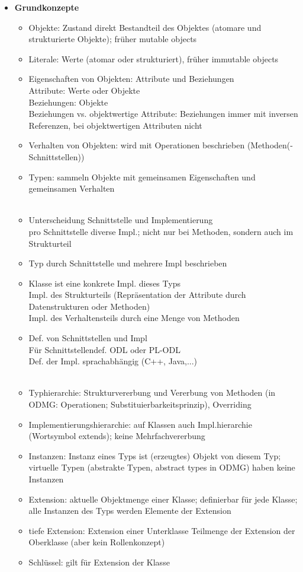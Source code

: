 \begin{itemize}
	\item \textbf{Grundkonzepte}
	\begin{itemize}
		\item Objekte: Zustand direkt Bestandteil des Objektes (atomare und strukturierte Objekte); früher mutable objects
		\item Literale: Werte (atomar oder strukturiert), früher immutable objects
		\item Eigenschaften von Objekten: Attribute und Beziehungen\\
		Attribute: Werte oder Objekte\\
		Beziehungen: Objekte\\
		Beziehungen vs. objektwertige Attribute: Beziehungen immer mit inversen Referenzen, bei objektwertigen Attributen nicht
		\item Verhalten von Objekten: wird mit Operationen beschrieben (Methoden(-Schnittstellen))
		\item Typen: sammeln Objekte mit gemeinsamen Eigenschaften und gemeinsamen Verhalten\\
		\\
		\item Unterscheidung Schnittstelle und Implementierung\\
		pro Schnittstelle diverse Impl.; nicht nur bei Methoden, sondern auch im Strukturteil
		\item Typ durch Schnittstelle und mehrere Impl beschrieben
		\item Klasse ist eine konkrete Impl. dieses Typs\\
		Impl. des Strukturteils (Repräsentation der Attribute durch Datenstrukturen oder Methoden)\\
		Impl. des Verhaltensteils durch eine Menge von Methoden
		\item Def. von Schnittstellen und Impl\\
		Für Schnittstellendef. ODL oder PL-ODL\\
		Def. der Impl. sprachabhängig (C++, Java,...)\\
		\\
		\item Typhierarchie: Strukturvererbung und Vererbung von Methoden (in ODMG: Operationen; Substituierbarkeitsprinzip), Overriding
		\item Implementierungshierarchie: auf Klassen auch Impl.hierarchie (Wortsymbol extends); keine Mehrfachvererbung
		\item Instanzen: Instanz eines Typs ist (erzeugtes) Objekt von diesem Typ; virtuelle Typen (abstrakte Typen, abstract types in ODMG) haben keine Instanzen
		\item Extension: aktuelle Objektmenge einer Klasse; definierbar für jede Klasse; alle Instanzen des Typs werden Elemente der Extension
		\item tiefe Extension: Extension einer Unterklasse Teilmenge der Extension der Oberklasse (aber kein Rollenkonzept)
		\item Schlüssel: gilt für Extension der Klasse
	\end{itemize}
\end{itemize}

